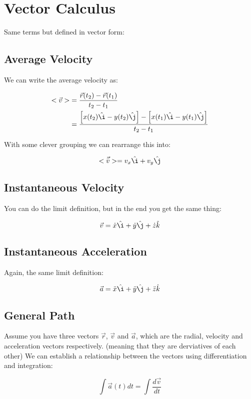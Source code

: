 \documentclass{article}
\theoremstyle{definition}
\numberwithin{equation}{section}
\numberwithin{definition}{section}
\begin{document}
\section{Vector Calculus}

Same terms but defined in vector form:

\subsection*{Average Velocity}
	We can write the average velocity as: 
	
	\begin{align*}
		<\vec{v}> &= \frac{\vec{r}(t_2) - \vec{r}(t_1)}{t_2-t_1} \\
		&= \frac{\left[x(t_2)\hat{\i} - y(t_2) \hat{\j}\right] - \left[x(t_1)\hat{\i} - y(t_1) \hat{\j}\right]}{t_2-t_1}
	\end{align*}

With some clever grouping we can rearrange this into:

\[ <\vec{\bar{v}}> = v_x \hat{\i} + v_y \hat{\j}\]

\subsection*{Instantaneous Velocity}

You can do the limit definition, but in the end you get the same thing:

\[ \vec{v} = \dot{x} \hat{\i} + \dot{y} \hat \j + \dot z \hat k\]


\subsection*{Instantaneous Acceleration}

Again, the same limit definition:

\[ \vec{a} = \ddot x \hat \i + \ddot y \hat \j + \ddot z \hat k\]


\subsection*{General Path}

Assume you have three vectors $\vec{r}$, $\vec{v}$ and $\vec{a}$, which are the radial, velocity and acceleration vectors respectively. (meaning that they are derviatives of each other) We can establish a relationship between the vectors using differentiation and integration:

\[ \int \vec a(t) dt = \int \frac{d\vec v}{dt} \]
\end{document}
